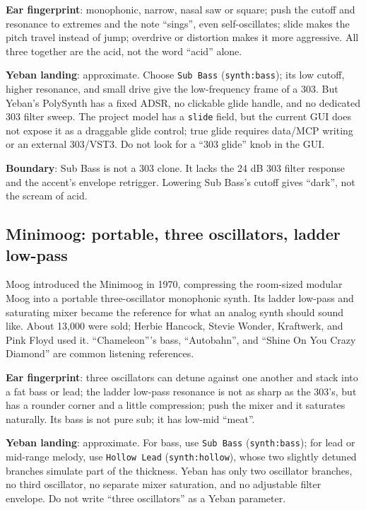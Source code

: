 \textbf{Ear fingerprint}: monophonic, narrow, nasal saw or square; push the
cutoff and resonance to extremes and the note ``sings'', even self-oscillates;
slide makes the pitch travel instead of jump; overdrive or distortion makes
it more aggressive. All three together are the acid, not the word ``acid''
alone.

\textbf{Yeban landing}: approximate. Choose \texttt{Sub Bass}
(\texttt{synth:bass}); its low cutoff, higher resonance, and small drive give
the low-frequency frame of a 303. But Yeban's PolySynth has a fixed ADSR, no
clickable glide handle, and no dedicated 303 filter sweep. The project model
has a \texttt{slide} field, but the current GUI does not expose it as a
draggable glide control; true glide requires data/MCP writing or an external
303/VST3. Do not look for a ``303 glide'' knob in the GUI.

\textbf{Boundary}: Sub Bass is not a 303 clone. It lacks the 24 dB 303 filter
response and the accent's envelope retrigger. Lowering Sub Bass's cutoff gives
``dark'', not the scream of acid.

\subsection{Minimoog: portable, three oscillators, ladder low-pass}
\label{sec:iconic-minimoog}

Moog introduced the Minimoog in 1970, compressing the room-sized modular Moog
into a portable three-oscillator monophonic synth. Its ladder low-pass and
saturating mixer became the reference for what an analog synth should sound
like. About 13,000 were sold; Herbie Hancock, Stevie Wonder, Kraftwerk, and
Pink Floyd used it. ``Chameleon'''s bass, ``Autobahn'', and ``Shine On You
Crazy Diamond'' are common listening references.

\textbf{Ear fingerprint}: three oscillators can detune against one another
and stack into a fat bass or lead; the ladder low-pass resonance is not as
sharp as the 303's, but has a rounder corner and a little compression; push
the mixer and it saturates naturally. Its bass is not pure sub; it has
low-mid ``meat''.

\textbf{Yeban landing}: approximate. For bass, use \texttt{Sub Bass}
(\texttt{synth:bass}); for lead or mid-range melody, use
\texttt{Hollow Lead} (\texttt{synth:hollow}), whose two slightly detuned
branches simulate part of the thickness. Yeban has only two oscillator
branches, no third oscillator, no separate mixer saturation, and no
adjustable filter envelope. Do not write ``three oscillators'' as a Yeban
parameter.

